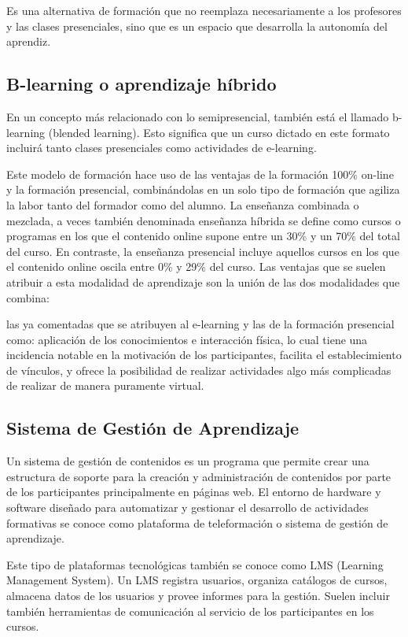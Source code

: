 Es una alternativa de formación que no reemplaza necesariamente a los profesores y las clases presenciales, sino que es un espacio que desarrolla la autonomía del aprendiz.

\subsection{B-learning o aprendizaje híbrido}

En un concepto más relacionado con lo semipresencial, también está el llamado b-learning (blended learning). Esto significa que un curso dictado en este formato incluirá tanto clases presenciales como actividades de e-learning.

Este modelo de formación hace uso de las ventajas de la formación 100\% on-line y la formación presencial, combinándolas en un solo tipo de formación que agiliza la labor tanto del formador como del alumno. La enseñanza combinada o mezclada, a veces también denominada enseñanza híbrida se define como cursos o programas en los que el contenido online supone entre un 30\% y un 70\% del total del curso. En contraste, la enseñanza presencial incluye aquellos cursos en los que el contenido online oscila entre 0\% y 29\% del curso. Las ventajas que se suelen atribuir a esta modalidad de aprendizaje son la unión de las dos modalidades que combina:

las ya comentadas que se atribuyen al e-learning y las de la formación presencial como: aplicación de los conocimientos e interacción física, lo cual tiene una incidencia notable en la motivación de los participantes, facilita el establecimiento de vínculos, y ofrece la posibilidad de realizar actividades algo más complicadas de realizar de manera puramente virtual.

\subsection{Sistema de Gestión de Aprendizaje}

Un sistema de gestión de contenidos es un programa que permite crear una estructura de soporte para la creación y administración de contenidos por parte de los participantes principalmente en páginas web. El entorno de hardware y software diseñado para automatizar y gestionar el desarrollo de actividades formativas se conoce como plataforma de teleformación o sistema de gestión de aprendizaje.

Este tipo de plataformas tecnológicas también se conoce como LMS (Learning Management System). Un LMS registra usuarios, organiza catálogos de cursos, almacena datos de los usuarios y provee informes para la gestión. Suelen incluir también herramientas de comunicación al servicio de los participantes en los cursos. 

